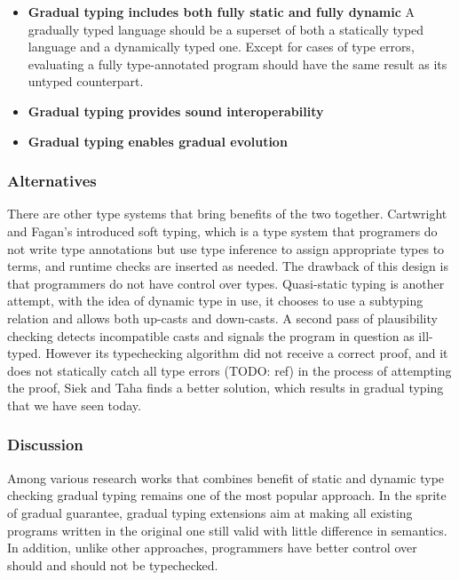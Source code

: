 \begin{itemize}
	\item \textbf{Gradual typing includes both fully static and fully dynamic}
	A gradually typed language should be a superset of both a statically typed
	language and a dynamically typed one.
	Except for cases of type errors, evaluating a fully type-annotated program
	should have the same result as its untyped counterpart.
	\item \textbf{Gradual typing provides sound interoperability}
	\item \textbf{Gradual typing enables gradual evolution}
\end{itemize}


\subsubsection{Alternatives}

There are other type systems that bring benefits of the two together.
Cartwright and Fagan's introduced soft typing, which is a type system
that programers do not write type annotations but use type inference to
assign appropriate types to terms, and runtime checks are inserted as needed.
The drawback of this design is that programmers do not have control over types.
Quasi-static typing is another attempt, with the idea of dynamic type in use,
it chooses to use a subtyping relation and allows both up-casts and down-casts.
A second pass of plausibility checking detects incompatible casts and signals the program
in question as ill-typed. However its typechecking algorithm did not receive a correct proof,
and it does not statically catch all type errors (TODO: ref)
in the process of attempting the proof, Siek and Taha finds a better solution, 
which results in gradual typing that we have seen today.

\subsubsection{Discussion}

Among various research works that combines
benefit of static and dynamic type checking
gradual typing remains one of the most popular approach.
In the sprite of gradual guarantee, gradual typing extensions aim at
making all existing programs written in the original one still valid with little difference in semantics.
In addition, unlike other approaches, programmers have better control over should and should not be typechecked.

